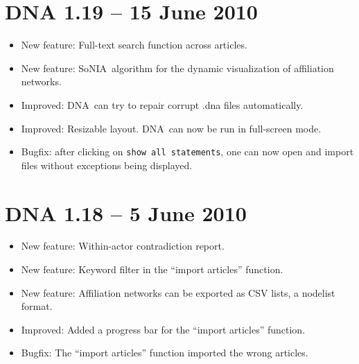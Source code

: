 \documentclass[12pt,a4paper]{scrreprt}
\newcommand{\dnashort}{\textsc{DNA}}
\newcommand{\sonia}{SoNIA}
\newcommand{\code}[1]{\texttt{#1}}
\begin{document}
\section*{DNA 1.19 -- 15 June 2010}
\begin{itemize}
 \item New feature: Full-text search function across articles.
 \item New feature: \sonia\ algorithm for the dynamic visualization of affiliation networks.
 \item Improved: \dnashort\ can try to repair corrupt .dna files automatically.
 \item Improved: Resizable layout. \dnashort\ can now be run in full-screen mode.
 \item Bugfix: after clicking on \code{show all statements}, one can now open and import files without exceptions being displayed.
\end{itemize}

\section*{DNA 1.18 -- 5 June 2010}
\begin{itemize}
 \item New feature: Within-actor contradiction report.
 \item New feature: Keyword filter in the ``import articles'' function.
 \item New feature: Affiliation networks can be exported as CSV lists, a nodelist format.
 \item Improved: Added a progress bar for the ``import articles'' function.
 \item Bugfix: The ``import articles'' function imported the wrong articles.
\end{itemize}
\end{document}
